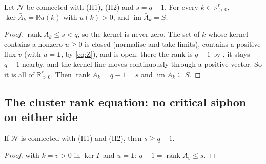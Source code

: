 \documentclass[11pt,a4paper]{report}
\newcommand{\Net}{\mathcal{N}}
\newcommand{\im}{\operatorname{im}}
\newcommand{\Rp}{\mathbb{R}_{>0}}
\begin{document}
\begin{lemma}\label{lem:R}
Let \(\Net\) be connected with (H1), (H2) and \(s=q-1\). For every \(k\in\Rp^r\), \(\ker\bar A_k=\mathbb{R}u(k)\) with
\(u(k)>0\), and \(\im\bar A_k=S\).
\end{lemma}
\begin{proof}
\(\operatorname{rank}\bar A_k\le s<q\), so the kernel is never zero. The set of \(k\) whose kernel contains a nonzero
\(u\ge0\) is closed (normalise and take limits), contains a positive flux \(v\) (with \(u=\mathbf 1\), by
\eqref{eq:Z}), and is open: there the rank is \(q-1\) by , it stays \(q-1\) nearby, and the kernel
line moves continuously through a positive vector. So it is all of \(\Rp^r\). Then \(\operatorname{rank}\bar A_k=q-1=s\)
and \(\im\bar A_k\subseteq S\).
\end{proof}

\subsection{The cluster rank equation: no critical siphon on either side}

\begin{proposition}[agents P, Q3]\label{prop:K5gen}
If \(\Net\) is connected with (H1) and (H2), then \(s\ge q-1\).
\end{proposition}
\begin{proof}
 with \(k=v>0\) in \(\ker\Gamma\) and \(u=\mathbf 1\): \(q-1=\operatorname{rank}\bar A_v\le s\).
\end{proof}
\end{document}
